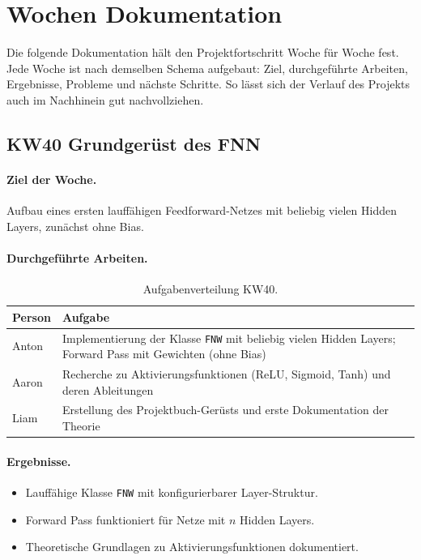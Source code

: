 \section{Wochen Dokumentation}
\label{sec:wochen}

Die folgende Dokumentation hält den Projektfortschritt Woche für Woche
fest. Jede Woche ist nach demselben Schema aufgebaut: Ziel, durchgeführte
Arbeiten, Ergebnisse, Probleme und nächste Schritte. So lässt sich der
Verlauf des Projekts auch im Nachhinein gut nachvollziehen.

\subsection{KW40 Grundgerüst des FNN}

\paragraph{Ziel der Woche.}
Aufbau eines ersten lauffähigen Feedforward-Netzes mit beliebig vielen
Hidden Layers, zunächst ohne Bias.

\paragraph{Durchgeführte Arbeiten.}
\begin{table}[htbp]
    \centering
    \small
    \begin{tabular}{l p{9cm}}
    \toprule
    \textbf{Person} & \textbf{Aufgabe} \\
    \midrule
    Anton   & Implementierung der Klasse \texttt{FNW} mit
              beliebig vielen Hidden Layers; Forward Pass mit
              Gewichten (ohne Bias) \\
    Aaron   & Recherche zu Aktivierungsfunktionen (ReLU, Sigmoid, Tanh)
              und deren Ableitungen \\
    Liam    & Erstellung des Projektbuch-Gerüsts und erste Dokumentation
              der Theorie \\
    \bottomrule
    \end{tabular}
    \caption{Aufgabenverteilung KW40.}
    \label{tab:kw40}
\end{table}

\paragraph{Ergebnisse.}
\begin{itemize}
    \item Lauffähige Klasse \texttt{FNW} mit konfigurierbarer
          Layer-Struktur.
    \item Forward Pass funktioniert für Netze mit $n$ Hidden Layers.
    \item Theoretische Grundlagen zu Aktivierungsfunktionen dokumentiert.
\end{itemize}



